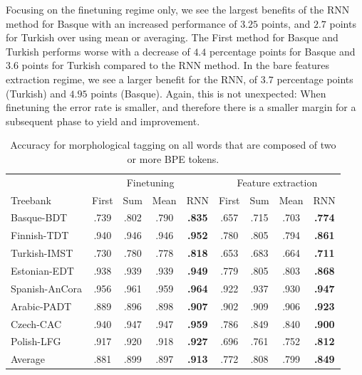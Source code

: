 \documentclass[11pt]{article}
\begin{document}
                Focusing on the finetuning regime only, we see the
     largest benefits of the RNN method for Basque with an increased
     performance of $3.25$ points, and $2.7$ points for Turkish over
     using mean or averaging. The First method for Basque and Turkish
     performs worse with a decrease of $4.4$ percentage points
     for Basque and $3.6$ points for Turkish compared to the RNN method.
        In the bare features extraction regime, we see a larger
     benefit for the RNN, of $3.7$ percentage points (Turkish) and
     $4.95$ points (Basque). Again, this is not unexpected: When
     finetuning the error rate is smaller, and therefore there is a
     smaller margin for a subsequent phase to yield and improvement.

    
	\begin{table}%
	\centering
	\begin{tabular}{l|cccc|cccc}
		 & \multicolumn{4}{c}{Finetuning} & \multicolumn{4}{c}{Feature extraction} \\
		Treebank & First & Sum & Mean & RNN & First & Sum & Mean & RNN  \\
		 \hline
        Basque-BDT      & .739 & .802 & .790 & \textbf{.835} & .657 & .715 & .703 & \textbf{.774} \\
		Finnish-TDT     & .940 & .946 & .946 & \textbf{.952} & .780 & .805 & .794 & \textbf{.861} \\ 
		Turkish-IMST    & .730 & .780 & .778 & \textbf{.818} & .653 & .683 & .664 & \textbf{.711} \\
		Estonian-EDT    & .938 & .939 & .939 & \textbf{.949} & .779 & .805 & .803 & \textbf{.868} \\
		Spanish-AnCora  & .956 & .961 & .959 & \textbf{.964} & .922 & .937 & .930 & \textbf{.947} \\
		Arabic-PADT     & .889 & .896 & .898 & \textbf{.907} & .902 & .909 & .906 & \textbf{.923}\\
		Czech-CAC       & .940 & .947 & .947 & \textbf{.959} & .786 & .849 & .840 & \textbf{.900} \\
		Polish-LFG      & .917 & .920 & .918 & \textbf{.927} & .696 & .761 & .752 & \textbf{.812} \\
        \hline
        Average         & .881 & .899 & .897 & \textbf{.913} & .772 & .808 & .799 & \textbf{.849} \\
	\end{tabular}
    \caption{\label{tab:results_large_tokens} Accuracy for
     morphological tagging on all words that are composed of two or
     more BPE tokens.}
\end{table}
\end{document}
